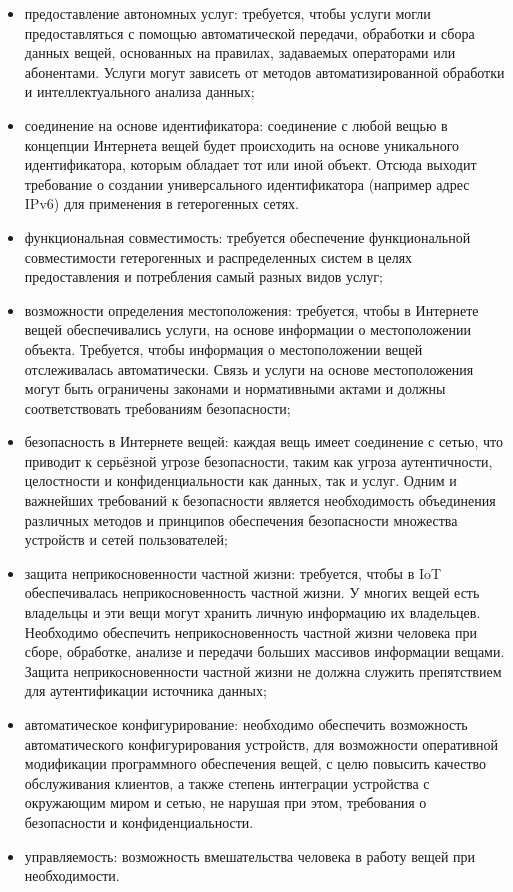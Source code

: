 \begin{itemize}
	\item предоставление автономных услуг: требуется, чтобы услуги могли 
предоставляться с помощью автоматической передачи, обработки и сбора данных 
вещей, основанных на правилах, задаваемых операторами или абонентами. Услуги 
могут зависеть от методов автоматизированной обработки и интеллектуального 
анализа данных;
	\item соединение на основе идентификатора: соединение с любой вещью в 
концепции Интернета вещей будет происходить на основе уникального 
идентификатора, которым обладает тот или иной объект. Отсюда выходит требование 
о создании универсального идентификатора (например адрес IPv6) для применения в 
гетерогенных сетях. \item функциональная совместимость: требуется обеспечение 
функциональной совместимости гетерогенных и распределенных систем в целях 
предоставления и потребления самый разных видов услуг;
	\item  возможности определения местоположения: требуется, чтобы в 
Интернете вещей обеспечивались услуги, на основе информации о местоположении 
объекта. Требуется, чтобы информация о местоположении вещей отслеживалась 
автоматически. Связь и услуги на основе местоположения могут быть ограничены 
законами и нормативными актами и должны соответствовать требованиям 
безопасности; \item безопасность в Интернете вещей: каждая вещь имеет 
соединение 
с сетью, что приводит к серьёзной угрозе безопасности, таким как угроза 
аутентичности, целостности и конфиденциальности как данных, так и услуг. Одним 
и 
важнейших требований к безопасности является необходимость объединения 
различных 
методов и принципов обеспечения безопасности множества устройств и сетей 
пользователей;
	\item защита неприкосновенности частной жизни: требуется, чтобы в IoT 
обеспечивалась неприкосновенность частной жизни. У многих вещей есть владельцы 
и 
эти вещи могут хранить личную информацию их владельцев. Необходимо обеспечить 
неприкосновенность частной жизни человека при сборе, обработке, анализе и 
передачи больших массивов информации вещами. Защита неприкосновенности частной 
жизни не должна служить препятствием для аутентификации источника данных; \item 
автоматическое конфигурирование: необходимо обеспечить возможность 
автоматического конфигурирования устройств, для возможности оперативной 
модификации программного обеспечения вещей, с целю повысить качество 
обслуживания клиентов, а также степень интеграции устройства с окружающим миром 
и сетью, не нарушая при этом, требования о безопасности и конфиденциальности.
	\item управляемость: возможность вмешательства человека в работу вещей 
при необходимости. 
\end{itemize}

